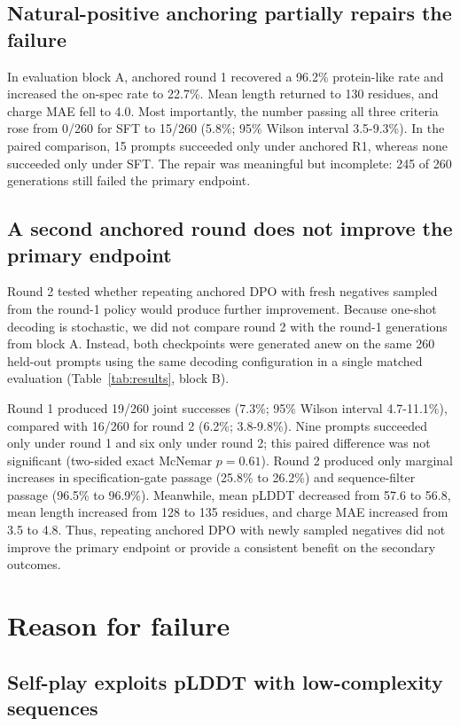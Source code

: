 \documentclass{article}
\begin{document}
\subsection{Natural-positive anchoring partially repairs the failure}

In evaluation block A, anchored round 1 recovered a 96.2\% protein-like rate
and increased the on-spec rate to 22.7\%. Mean length returned to 130 residues,
and charge MAE fell to 4.0. Most importantly, the number passing all three
criteria rose from 0/260 for SFT to 15/260 (5.8\%; 95\% Wilson interval
3.5-9.3\%). In the paired comparison, 15 prompts succeeded only under anchored R1, whereas none succeeded only under SFT.
The repair was meaningful but incomplete: 245 of 260 generations still failed
the primary endpoint.

\subsection{A second anchored round does not improve the primary endpoint}

Round 2 tested whether repeating anchored DPO with fresh negatives sampled from
the round-1 policy would produce further improvement. Because one-shot decoding
is stochastic, we did not compare round 2 with the round-1 generations from
block A. Instead, both checkpoints were generated anew on the same 260 held-out
prompts using the same decoding configuration in a single matched evaluation
(Table~\ref{tab:results}, block B).

Round 1 produced 19/260 joint successes (7.3\%; 95\% Wilson interval
4.7-11.1\%), compared with 16/260 for round 2 (6.2\%; 3.8-9.8\%). Nine
prompts succeeded only under round 1 and six only under round 2; this paired
difference was not significant (two-sided exact McNemar $p=0.61$). Round 2
produced only marginal increases in specification-gate passage
(25.8\% to 26.2\%) and sequence-filter passage (96.5\% to 96.9\%). Meanwhile,
mean pLDDT decreased from 57.6 to 56.8, mean length increased from 128 to 135
residues, and charge MAE increased from 3.5 to 4.8. Thus, repeating anchored
DPO with newly sampled negatives did not improve the primary endpoint or
provide a consistent benefit on the secondary outcomes.

\section{Reason for failure}
\label{sec:failure}

\subsection{Self-play exploits pLDDT with low-complexity sequences}
\end{document}
